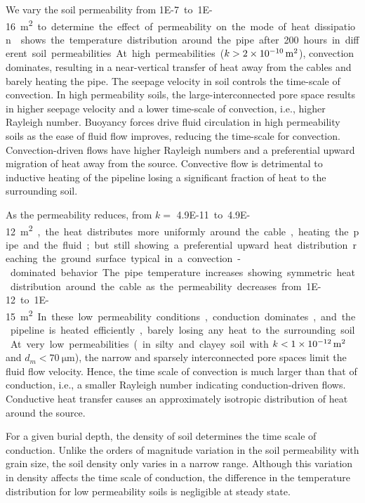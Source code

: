\documentclass[Journal,letterpaper,InsideFigs]{ascelike-new}
\begin{document}
We vary the soil permeability from \SI{1E-7} to \SI{1E-16}{\meter\squared} to determine the effect of permeability on the mode of heat dissipation.~ shows the temperature distribution around the pipe after 200 hours in different soil permeabilities. At high permeabilities ($k > \SI{2E-10}{\meter\squared}$), convection dominates, resulting in a near-vertical transfer of heat away from the cables and barely heating the pipe. The seepage velocity in soil controls the time-scale of convection. In high permeability soils, the large-interconnected pore space results in higher seepage velocity and a lower time-scale of convection, i.e., higher Rayleigh number. Buoyancy forces drive fluid circulation in high permeability soils as the ease of fluid flow improves, reducing the time-scale for convection. Convection-driven flows have higher Rayleigh numbers and a preferential upward migration of heat away from the source. Convective flow is detrimental to inductive heating of the pipeline losing a significant fraction of heat to the surrounding soil.

As the permeability reduces, from $k =$ \SI{4.9E-11} to \SI{4.9E-12}{\meter\squared}, the heat distributes more uniformly around the cable, heating the pipe and the fluid; but still showing a preferential upward heat distribution reaching the ground surface typical in a convection-dominated behavior. The pipe temperature increases showing symmetric heat distribution around the cable as the permeability decreases from \SI{1E-12} to \SI{1E-15}{\meter\squared}. In these low permeability conditions, conduction dominates, and the pipeline is heated efficiently, barely losing any heat to the surrounding soil. At very low permeabilities (in silty and clayey soil with $k < \SI{1E-12}{\meter\squared}$ and $d_m < \SI{70}{\micro\meter}$), the narrow and sparsely interconnected pore spaces limit the fluid flow velocity. Hence, the time scale of convection is much larger than that of conduction, i.e., a smaller Rayleigh number indicating conduction-driven flows. Conductive heat transfer causes an approximately isotropic distribution of heat around the source. 

For a given burial depth, the density of soil determines the time scale of conduction. Unlike the orders of magnitude variation in the soil permeability with grain size, the soil density only varies in a narrow range. Although this variation in density affects the time scale of conduction, the difference in the temperature distribution for low permeability soils is negligible at steady state. 
\end{document}
